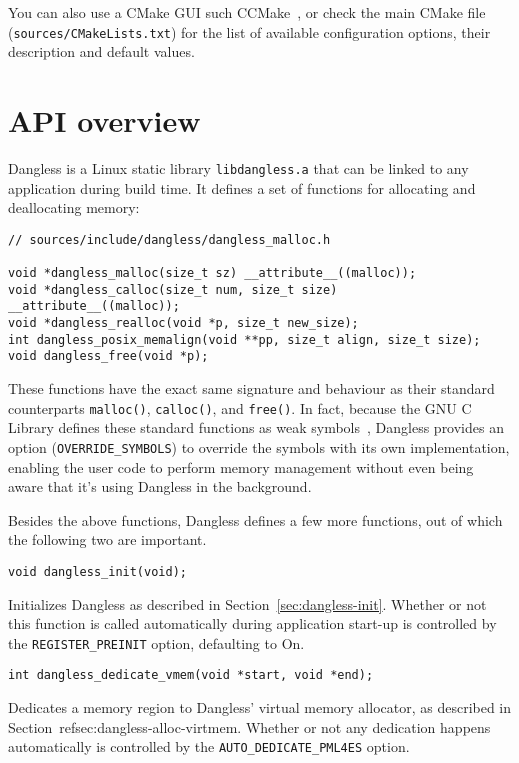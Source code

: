 You can also use a CMake GUI such CCMake~\cite{ccmake-website}, or check the main CMake file (\texttt{sources/CMakeLists.txt}) for the list of available configuration options, their description and default values.

\section{API overview}

Dangless is a Linux static library \texttt{libdangless.a} that can be linked to any application during build time. It defines a set of functions for allocating and deallocating memory:

\begin{lstlisting}
// sources/include/dangless/dangless_malloc.h

void *dangless_malloc(size_t sz) __attribute__((malloc));
void *dangless_calloc(size_t num, size_t size) __attribute__((malloc));
void *dangless_realloc(void *p, size_t new_size);
int dangless_posix_memalign(void **pp, size_t align, size_t size);
void dangless_free(void *p);
\end{lstlisting}

These functions have the exact same signature and behaviour as their standard counterparts \lstinline!malloc()!, \lstinline!calloc()!, and \lstinline!free()!. In fact, because the GNU C Library defines these standard functions as weak symbols~\cite{glibc-malloc-is-weak}, Dangless provides an option (\lstinline!OVERRIDE_SYMBOLS!) to override the symbols with its own implementation, enabling the user code to perform memory management without even being aware that it's using Dangless in the background.

Besides the above functions, Dangless defines a few more functions, out of which the following two are important.

\begin{lstlisting}
void dangless_init(void);
\end{lstlisting}

Initializes Dangless as described in Section~\ref{sec:dangless-init}. Whether or not this function is called automatically during application start-up is controlled by the \lstinline!REGISTER_PREINIT! option, defaulting to On.

\begin{lstlisting}
int dangless_dedicate_vmem(void *start, void *end);
\end{lstlisting}

Dedicates a memory region to Dangless' virtual memory allocator, as described in Section~ref{sec:dangless-alloc-virtmem}.
Whether or not any dedication happens automatically is controlled by the \lstinline!AUTO_DEDICATE_PML4ES! option.

